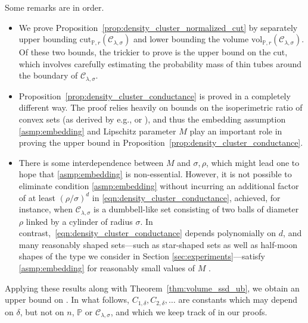 \documentclass[11pt,twoside]{article}
\newcommand{\1}{\mathbf{1}}
\newcommand{\mc}[1]{\mathcal{#1}}
\newcommand{\Pbb}{\mathbb{P}}
\newcommand{\wh}[1]{\widehat{#1}}
\newcommand{\vol}{\mathrm{vol}}
\newcommand{\cut}{\mathrm{cut}}
\begin{document}
Some remarks are in order.
\begin{itemize}
	\item We prove Proposition~\ref{prop:density_cluster_normalized_cut} by separately upper bounding $\cut_{\Pbb,r}(\mc{C}_{\lambda,\sigma})$ and lower bounding the volume $\vol_{\Pbb,r}(\mc{C}_{\lambda,\sigma})$. Of these two bounds, the trickier to prove is the upper bound on the cut, which involves carefully estimating the probability mass of thin tubes around the boundary of $\mc{C}_{\lambda,\sigma}$. 
	\item Proposition~\ref{prop:density_cluster_conductance} is proved in a completely different way. The proof relies heavily on bounds on the isoperimetric ratio of convex sets (as derived by e.g., \cite{lovasz1990} or \cite{dyer1991b}), and thus the embedding assumption \ref{asmp:embedding} and Lipschitz parameter $M$
	play an important role in proving the upper bound in Proposition~\ref{prop:density_cluster_conductance}. 
	\item There is some interdependence between $M$ and $\sigma,\rho$, which might lead one to hope that \ref{asmp:embedding} is
	non-essential. However, it is not possible to eliminate condition \ref{asmp:embedding} without incurring an additional factor of at least
	$(\rho/\sigma)^d$ in \eqref{eqn:density_cluster_conductance}, achieved, for
	instance, when $\mc{C}_{\lambda,\sigma}$ is a dumbbell-like set consisting of two balls of diameter $\rho$ linked by a cylinder of radius $\sigma$. In contrast,~\eqref{eqn:density_cluster_conductance} depends polynomially on $d$, and many reasonably shaped sets---such as star-shaped sets as well as half-moon shapes of the type we consider in Section \ref{sec:experiments}---satisfy \ref{asmp:embedding} for reasonably small values of $M$ \citep{abbasi-yadkori2016a, abbasi-yadkori2016}.
\end{itemize}

Applying these results along with Theorem~\ref{thm:volume_ssd_ub}, we obtain an upper bound on \smash{$\Delta(\wh{C},\mc{C}_{\lambda,\sigma}[X])$}. In what follows, $C_{1,\delta},C_{2,\delta},\ldots$ are constants which may depend on $\delta$, but not on $n$, $\Pbb$ or $\mc{C}_{\lambda,\sigma}$, and which we keep track of in our proofs.
\end{document}
